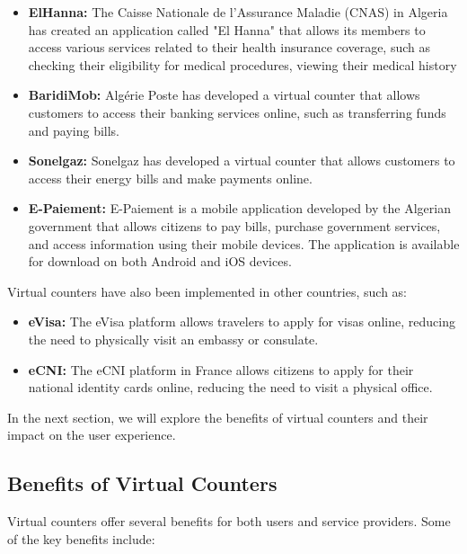 \begin{itemize}
  \item \textbf{ElHanna:} The Caisse Nationale de l'Assurance Maladie (CNAS) in Algeria has created an application called "El Hanna" that allows its members to access various services related to their health insurance coverage, such as checking their eligibility for medical procedures, viewing their medical history
  \item \textbf{BaridiMob:} Algérie Poste has developed a virtual counter that allows customers to access their banking services online, such as transferring funds and paying bills.
  \item \textbf{Sonelgaz:} Sonelgaz has developed a virtual counter that allows customers to access their energy bills and make payments online.
  \item \textbf{E-Paiement:} E-Paiement is a mobile application developed by the Algerian government that allows citizens to pay bills, purchase government services, and access information using their mobile devices. The application is available for download on both Android and iOS devices.
\end{itemize}

Virtual counters have also been implemented in other countries, such as:

\begin{itemize}
  \item \textbf{eVisa:} The eVisa platform allows travelers to apply for visas online, reducing the need to physically visit an embassy or consulate.
  \item \textbf{eCNI:} The eCNI platform in France allows citizens to apply for their national identity cards online, reducing the need to visit a physical office.
\end{itemize}

In the next section, we will explore the benefits of virtual counters and their impact on the user experience.

\subsection{Benefits of Virtual Counters}
Virtual counters offer several benefits for both users and service providers. Some of the key benefits include:

